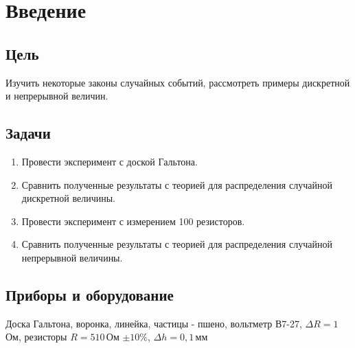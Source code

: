 \section{Введение}
\subsection{Цель}

Изучить некоторые законы случайных событий, рассмотреть примеры дискретной и непрерывной величин. 
\subsection{Задачи}
\begin{enumerate}
	\item Провести эксперимент с доской Гальтона.
	
	\item Сравнить полученные результаты с теорией для распределения случайной дискретной величины. 
	
	\item Провести эксперимент с измерением 100 резисторов.
	
	\item  Сравнить полученные результаты с теорией для распределения случайной непрерывной величины.
	
\end{enumerate}
\subsection{Приборы и оборудование}
Доска Гальтона, воронка, линейка, частицы - пшено, вольтметр В7-27, $\Delta R = 1\,$Ом, резисторы $R = 510\,$Ом $\pm10\%$, $\Delta h = 0,1\,$мм